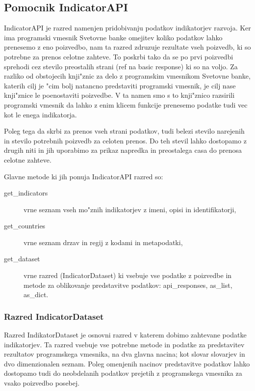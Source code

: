 \subsection{Pomocnik IndicatorAPI}

IndicatorAPI je razred namenjen pridobivanju podatkov indikatorjev razvoja.
Ker ima programski vmesnik Svetovne banke omejitev koliko podatkov lahko
prenesemo z eno poizvedbo, nam ta razred zdruzuje rezultate vseh poizvedb, ki
so potrebne za prenos celotne zahteve. To poskrbi tako da se po prvi poizvedbi
sprehodi cez stevilo preostalih strani (ref na basic response) ki so na voljo. 
Za razliko od obstojecih knji"znic
 za delo z programskim vmesnikom
Svetovne banke, katerih cilj je "cim bolj natancno predstaviti programski 
vmesnik, je cilj nase knji"znice le poenostaviti poizvedbe. V ta namen smo s to
knji"znico razsirili programski vmesnik da lahko z enim klicem funkcije 
prenesemo podatke tudi vec kot le enega indikatorja.

Poleg tega da skrbi za prenos vseh strani podatkov, tudi belezi stevilo 
narejenih in stevilo potrebnih poizvedb za celoten prenos. Do teh stevil lahko
dostopamo z drugih niti in jih uporabimo za prikaz napredka in preostalega
casa do prenosa celotne zahteve.

Glavne metode ki jih ponuja IndicatorAPI razred so:

\begin{description}  
\item [get\_indicators] vrne seznam vseh mo"znih indikatorjev z imeni, opisi in
      identifikatorji,
\item [get\_countries] vrne seznam drzav in regij z kodami in metapodatki,
\item [get\_dataset] vrne razred (IndicatorDataset) ki vsebuje vse podatke z 
      poizvedbe in metode za oblikovanje predstavitve podatkov: api\_responses,
      as\_list, as\_dict.
\end{description}



\subsubsection{Razred IndicatorDataset}

Razred IndikatorDataset je osnovni razred v katerem dobimo zahtevane podatke
indikatorjev. Ta razred vsebuje vse potrebne metode in podatke za predstavitev
rezultatov programskega vmesnika, na dva glavna nacina; kot slovar slovarjev in
dvo dimenzionalen seznam. Poleg omenjenih nacinov predstavitve podatkov lahko
dostopamo tudi do neobdelanih podatkov prejetih z programskega vmesnika za
vsako poizvedbo posebej.


